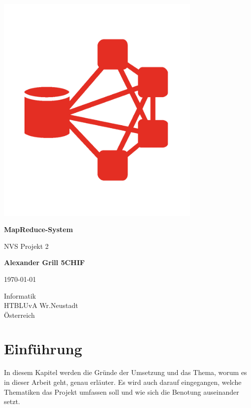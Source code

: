 \documentclass[a4paper,12pt]{article}
\begin{document}
\begin{titlepage}
    \begin{center}
        \vspace*{1cm}
        \includegraphics[width=10cm]{Logo.png}
        
        \textbf{\huge MapReduce-System}
        
        \vspace{0.5cm}
        NVS Projekt 2
                 
        \vspace{1.0cm}
    
        \textbf{Alexander Grill 5CHIF}
        
        \today
        
        \vfill
                 
                 
        \vspace{0.5cm}
                 
        Informatik\\
        HTBLUvA Wr.Neustadt\\
        Österreich\\

                 
    \end{center}
\end{titlepage}  
\newpage
\tableofcontents
\newpage


\section{Einführung}
In diesem Kapitel werden die Gründe der Umsetzung und das Thema, worum es in dieser Arbeit geht, genau erläuter. Es wird auch
darauf eingegangen, welche Thematiken das Projekt umfassen soll und wie sich die Benotung auseinander setzt.
\end{document}
